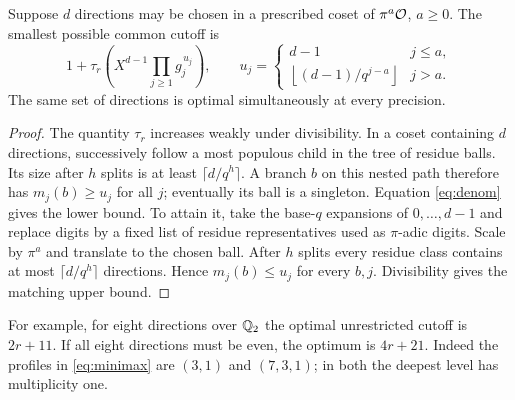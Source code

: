 \begin{theorem}\label{thm:opt}
Suppose $d$ directions may be chosen in a prescribed coset of $\pi^a\mathcal O$, $a\ge0$. The smallest possible common cutoff is
\begin{equation}
       1+\tau_r\!\left(X^{d-1}\prod_{j\ge1}g_j^{\,u_j}\right),
 \qquad
 u_j=\begin{cases}
    d-1&j\le a,\\[2pt]
    \left\lfloor(d-1)/q^{j-a}\right\rfloor&j>a .
 \end{cases} \label{eq:minimax}
\end{equation}
The same set of directions is optimal simultaneously at every precision.
\end{theorem}
\begin{proof}
The quantity $\tau_r$ increases weakly under divisibility. In a coset containing $d$ directions, successively follow a most populous child in the tree of residue balls. Its size after $h$ splits is at least $\lceil d/q^h\rceil$. A branch $b$ on this nested path therefore has $m_j(b)\ge u_j$ for all $j$; eventually its ball is a singleton. Equation \eqref{eq:denom} gives the lower bound. To attain it, take the base-$q$ expansions of $0,\ldots,d-1$ and replace digits by a fixed list of residue representatives used as $\pi$-adic digits. Scale by $\pi^a$ and translate to the chosen ball. After $h$ splits every residue class contains at most $\lceil d/q^h\rceil$ directions. Hence $m_j(b)\le u_j$ for every $b,j$. Divisibility gives the matching upper bound.
\end{proof}
For example, for eight directions over $\mathbb Q_2$ the optimal unrestricted cutoff is $2r+11$. If all eight directions must be even, the optimum is $4r+21$. Indeed the profiles in \eqref{eq:minimax} are $(3,1)$ and $(7,3,1)$; in both the deepest level has multiplicity one.

